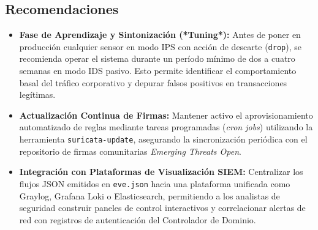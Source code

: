 \subsection{Recomendaciones}

\begin{itemize}
  \item \textbf{Fase de Aprendizaje y Sintonización (*Tuning*):} Antes de poner en producción cualquier sensor en modo IPS con acción de descarte (\texttt{drop}), se recomienda operar el sistema durante un período mínimo de dos a cuatro semanas en modo IDS pasivo. Esto permite identificar el comportamiento basal del tráfico corporativo y depurar falsos positivos en transacciones legítimas.
  \item \textbf{Actualización Continua de Firmas:} Mantener activo el aprovisionamiento automatizado de reglas mediante tareas programadas (\textit{cron jobs}) utilizando la herramienta \texttt{suricata-update}, asegurando la sincronización periódica con el repositorio de firmas comunitarias \textit{Emerging Threats Open}.
  \item \textbf{Integración con Plataformas de Visualización SIEM:} Centralizar los flujos JSON emitidos en \texttt{eve.json} hacia una plataforma unificada como Graylog, Grafana Loki o Elasticsearch, permitiendo a los analistas de seguridad construir paneles de control interactivos y correlacionar alertas de red con registros de autenticación del Controlador de Dominio.
\end{itemize}
